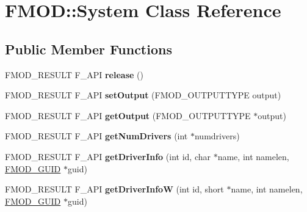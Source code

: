 \hypertarget{class_f_m_o_d_1_1_system}{\section{F\-M\-O\-D\-:\-:System Class Reference}
\label{class_f_m_o_d_1_1_system}
}
\subsection*{Public Member Functions}
\begin{DoxyCompactItemize}
\item 
\hypertarget{class_f_m_o_d_1_1_system_aa7ac27bd5b475d40b6ca4b3b93a9351d}{F\-M\-O\-D\-\_\-\-R\-E\-S\-U\-L\-T F\-\_\-\-A\-P\-I {\bfseries release} ()}\label{class_f_m_o_d_1_1_system_aa7ac27bd5b475d40b6ca4b3b93a9351d}

\item 
\hypertarget{class_f_m_o_d_1_1_system_a97cba04b9a36251e4443aaeba23f2d45}{F\-M\-O\-D\-\_\-\-R\-E\-S\-U\-L\-T F\-\_\-\-A\-P\-I {\bfseries set\-Output} (F\-M\-O\-D\-\_\-\-O\-U\-T\-P\-U\-T\-T\-Y\-P\-E output)}\label{class_f_m_o_d_1_1_system_a97cba04b9a36251e4443aaeba23f2d45}

\item 
\hypertarget{class_f_m_o_d_1_1_system_a3abd8e368b7b220b761fd885ba150485}{F\-M\-O\-D\-\_\-\-R\-E\-S\-U\-L\-T F\-\_\-\-A\-P\-I {\bfseries get\-Output} (F\-M\-O\-D\-\_\-\-O\-U\-T\-P\-U\-T\-T\-Y\-P\-E $\ast$output)}\label{class_f_m_o_d_1_1_system_a3abd8e368b7b220b761fd885ba150485}

\item 
\hypertarget{class_f_m_o_d_1_1_system_aabd75260613afffc7ef0650ac62ef2f4}{F\-M\-O\-D\-\_\-\-R\-E\-S\-U\-L\-T F\-\_\-\-A\-P\-I {\bfseries get\-Num\-Drivers} (int $\ast$numdrivers)}\label{class_f_m_o_d_1_1_system_aabd75260613afffc7ef0650ac62ef2f4}

\item 
\hypertarget{class_f_m_o_d_1_1_system_a1740086b76cb4609109cb2b7c6484749}{F\-M\-O\-D\-\_\-\-R\-E\-S\-U\-L\-T F\-\_\-\-A\-P\-I {\bfseries get\-Driver\-Info} (int id, char $\ast$name, int namelen, \hyperlink{struct_f_m_o_d___g_u_i_d}{F\-M\-O\-D\-\_\-\-G\-U\-I\-D} $\ast$guid)}\label{class_f_m_o_d_1_1_system_a1740086b76cb4609109cb2b7c6484749}

\item 
\hypertarget{class_f_m_o_d_1_1_system_ad08a70658919844b618ff2ade2e2441a}{F\-M\-O\-D\-\_\-\-R\-E\-S\-U\-L\-T F\-\_\-\-A\-P\-I {\bfseries get\-Driver\-Info\-W} (int id, short $\ast$name, int namelen, \hyperlink{struct_f_m_o_d___g_u_i_d}{F\-M\-O\-D\-\_\-\-G\-U\-I\-D} $\ast$guid)}\label{class_f_m_o_d_1_1_system_ad08a70658919844b618ff2ade2e2441a}


\end{DoxyCompactItemize}
